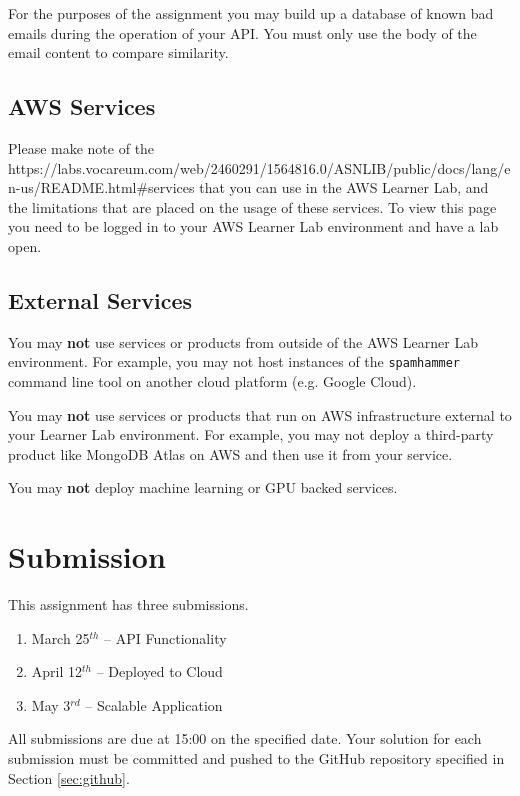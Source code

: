\documentclass{csse4400}
\begin{document}
For the purposes of the assignment you may build up a database of known bad emails during the operation of your API. You must only use the body of the email content to compare similarity.


\subsection{AWS Services}
Please make note of the 
{https://labs.vocareum.com/web/2460291/1564816.0/ASNLIB/public/docs/lang/en-us/README.html\#services}
that you can use in the AWS Learner Lab, and the limitations that are placed on the usage of these services.
To view this page you need to be logged in to your AWS Learner Lab environment and have a lab open.

\subsection{External Services}
You may \textbf{not} use services or products from outside of the AWS Learner Lab environment.
For example, you may not host instances of the \texttt{spamhammer} command line tool on another cloud platform
(e.g. Google Cloud).

You may \textbf{not} use services or products that run on AWS infrastructure external to your Learner Lab environment.
For example, you may not deploy a third-party product like MongoDB Atlas on AWS and then use it from your service.

You may \textbf{not} deploy machine learning or GPU backed services.

\section{Submission}
This assignment has three submissions.

\begin{enumerate}
  \item March 25$^{th}$ -- API Functionality
  \item April 12$^{th}$ -- Deployed to Cloud
  \item May 3$^{rd}$ -- Scalable Application
\end{enumerate}
All submissions are due at 15:00 on the specified date.
Your solution for each submission must be committed and pushed to the GitHub repository specified in Section \ref{sec:github}.
\end{document}
